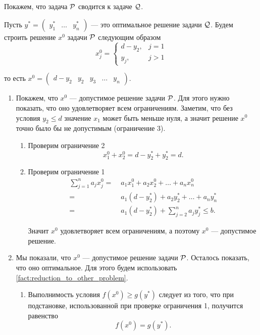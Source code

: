 Покажем, что задача $\P$ сводится к задаче $\Q$.

\prooof

Пусть $y^* = \begin{pmatrix} y^*_1 & \dots & y^*_n \end{pmatrix}$ --- это оптимальное решение задачи $\Q$. Будем строить решение $x^0$ задачи $\P$ следующим образом
\[
	x^0_j = \begin{cases}
		d - y_2,& j = 1 \\
		y_j,& j > 1
	\end{cases}
\]

то есть $x^0 = \begin{pmatrix} d - y_2 & y_2 & y_3 & \dots & y_n \end{pmatrix}$.

\begin{enumerate}[nosep]
	\item Покажем, что $x^0$ --- допустимое решение задачи $\P$. Для этого нужно показать, что оно удовлетворяет всем ограничениям. Заметим, что без условия $y_2 \le d$ значение $x_1$ может быть меньше нуля, а значит решение $x^0$ точно было бы не допустимым (ограничение 3).
	
	\begin{enumerate}
		\item Проверим ограничение 2
			\[
				x^0_1 + x^0_2 = d - y^*_2 + y^*_2 = d.
			\]
			
		\item Проверим ограничение 1
			\begin{align*}
				\sum_{j=1}^{n} a_j x^0_j =& \; a_1 x^0_1 + a_2 x^0_2 + \dots + a_n x^0_n \\
				=& \; a_1 (d - y^*_2) + a_2 y^*_2 + \dots + a_n y^*_n \\
				=& \; a_1 (d-y^*_2) + \sum_{j=2}^{n}a_j y^*_j \le b.
			\end{align*}
		
			Значит $x^0$ удовлетворяет всем ограничениям, а поэтому $x^0$ --- допустимое решение.	
	\end{enumerate}
	
	\item Мы показали, что $x^0$ --- допустимое решение задачи $\P$. Осталось показать, что оно оптимальное. Для этого будем использовать \cref{fact:reduction_to_other_problem}.
		
		\begin{enumerate}
			\item Выполнимость условия $f(x^0) \ge g(y^*)$ следует из того, что при подстановке, использованной при проверке ограничения 1, получится равенство
			\[
				f(x^0) = g(y^*).
			\]
			

\end{enumerate}
\end{enumerate}
